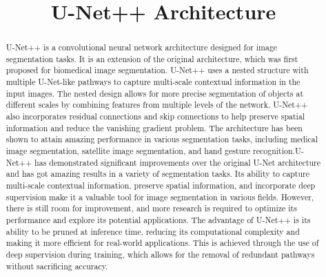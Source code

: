 \documentclass[conference]{IEEEtran}
\begin{document}
\title{U-Net++ Architecture\\
}

\author{
\and
{}
\and
{}
}

\maketitle

\begin{abstract}
U-Net++ is a convolutional neural network architecture designed for image segmentation tasks. It is an extension of the original architecture, which was first proposed for biomedical image segmentation. U-Net++ uses a nested structure with multiple U-Net-like pathways to capture multi-scale contextual information in the input images. The nested design allows for more precise segmentation of objects at different scales by combining features from multiple levels of the network. U-Net++ also incorporates residual connections and skip connections to help preserve spatial information and reduce the vanishing gradient problem. The architecture has been shown to attain amazing performance in various segmentation tasks, including medical image segmentation, satellite image segmentation, and hand gesture recognition.U-Net++ has demonstrated significant improvements over the original U-Net architecture and has got amazing results in a variety of segmentation tasks. Its ability to capture multi-scale contextual information, preserve spatial information, and incorporate deep supervision make it a valuable tool for image segmentation in various fields. However, there is still room for improvement, and more research is required to optimize its performance and explore its potential applications. The advantage of U-Net++ is its ability to be pruned at inference time, reducing its computational complexity and making it more efficient for real-world applications. This is achieved through the use of deep supervision during training, which allows for the removal of redundant pathways without sacrificing accuracy.



\end{abstract}
\end{document}
